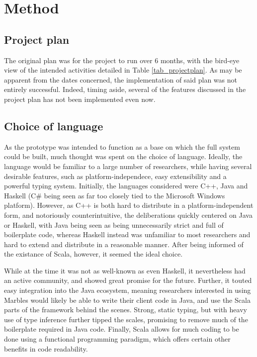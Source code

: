 \section{Method}

\subsection{Project plan}

The original plan was for the project to run over 6 months, with the
bird-eye view of the intended activities detailed in Table
\ref{tab_projectplan}. As may be apparent from the dates concerned, the
implementation of said plan was not entirely successful. Indeed, timing
aside, several of the features discussed in the project plan has not been
implemented even now. 


\subsection{Choice of language}

As the prototype was intended to function as a base on which the full
system could be built, much thought was spent on the choice of language.
Ideally, the language would be familiar to a large number of researchers,
while having several desirable features, such as platform-independece, easy
extensibility and a powerful typing system. Initially, the languages
considered were C++, Java and Haskell (C# being seen as far too closely
tied to the Microsoft Windows platform). However, as C++ is both hard to
distribute in a platform-independent form, and notoriously
counterintuitive, the deliberations quickly centered on Java or Haskell,
with Java being seen as being unnecessarily strict and full of boilerplate
code, whereas Haskell instead was unfamiliar to most researchers and hard
to extend and distribute in a reasonable manner. After being informed of
the existance of Scala, however, it seemed the ideal choice.

While at the time it was not as well-known as even Haskell, it nevertheless
had an active community, and showed great promise for the future. Further,
it touted easy integration into the Java ecosystem, meaning researchers
interested in using Marbles would likely be able to write their client code
in Java, and use the Scala parts of the framework behind the scenes.
Strong, static typing, but with heavy use of type inference further tipped
the scales, promising to remove much of the boilerplate required in Java
code. Finally, Scala allows for much coding to be done using a functional
programming paradigm, which offers certain other benefits in code
readability.

